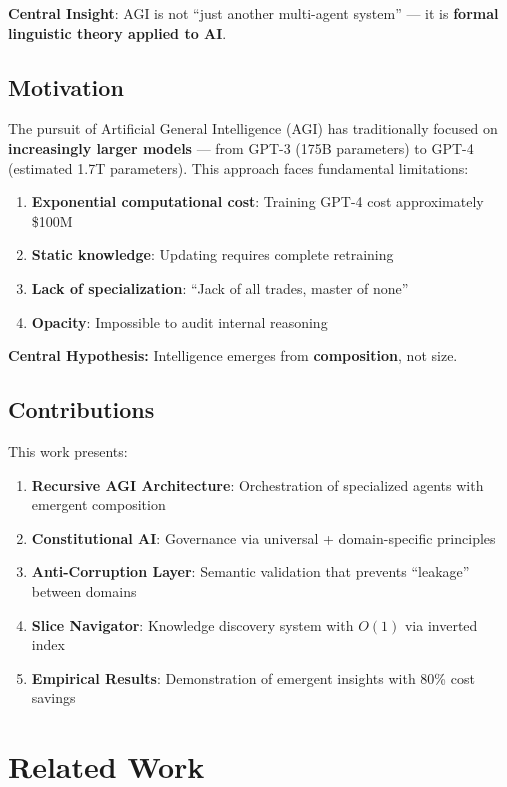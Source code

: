 \documentclass[11pt]{article}
\begin{document}
\textbf{Central Insight}: AGI is not ``just another multi-agent system'' --- it is \textbf{formal linguistic theory applied to AI}.

\subsection{Motivation}

The pursuit of Artificial General Intelligence (AGI) has traditionally focused on \textbf{increasingly larger models} --- from GPT-3 (175B parameters) to GPT-4 (estimated 1.7T parameters). This approach faces fundamental limitations:

\begin{enumerate}
    \item \textbf{Exponential computational cost}: Training GPT-4 cost approximately \$100M
    \item \textbf{Static knowledge}: Updating requires complete retraining
    \item \textbf{Lack of specialization}: ``Jack of all trades, master of none''
    \item \textbf{Opacity}: Impossible to audit internal reasoning
\end{enumerate}

\textbf{Central Hypothesis:} Intelligence emerges from \textbf{composition}, not size.

\subsection{Contributions}

This work presents:

\begin{enumerate}
    \item \textbf{Recursive AGI Architecture}: Orchestration of specialized agents with emergent composition
    \item \textbf{Constitutional AI}: Governance via universal + domain-specific principles
    \item \textbf{Anti-Corruption Layer}: Semantic validation that prevents ``leakage'' between domains
    \item \textbf{Slice Navigator}: Knowledge discovery system with $O(1)$ via inverted index
    \item \textbf{Empirical Results}: Demonstration of emergent insights with 80\% cost savings
\end{enumerate}

\section{Related Work}
\end{document}
